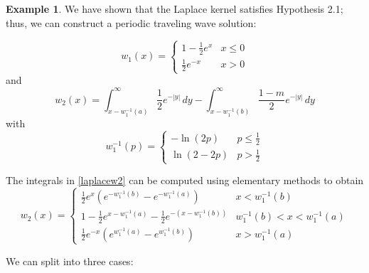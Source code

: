 \documentclass[11pt]{article}
\theoremstyle{definition}
\newtheorem{ex}[thm]{Example}
\numberwithin{equation}{section}
\numberwithin{thm}{section}
\newcommand{\winva}{{w_1^{-1}(a)}}
\newcommand{\winvb}{{w_1^{-1}(b)}}
\begin{document}
\begin{ex}
We have shown that the Laplace kernel satisfies Hypothesis 2.1; thus, we can construct a periodic traveling wave solution:

\begin{equation}
w_1(x) =   \begin{cases} 
1 - \frac{1}{2}e^{x} & x \leq 0 \\
\frac{1}{2}e^{-x} & x > 0
\end{cases}
\end{equation}
and
\begin{equation}\label{laplacew2}
w_2(x) = \int_{x-\winva}^{\infty} \frac{1}{2} e^{-|y|} \,dy - \int_{x-\winvb}^{\infty} \frac{1-m}{2} e^{-|y|} \,dy
\end{equation}
with
$$ w_1^{-1}(p) = \begin{cases} -\ln(2p) & p\leq \frac{1}{2} \\ \ln(2-2p) & p > \frac{1}{2} \end{cases} $$

The integrals in \eqref{laplacew2} can be computed using elementary methods to obtain
\begin{equation}
w_2(x) = \begin{cases}
\frac{1}{2} e^x \left( e^{-w_1^{-1}(b)} -e^{-w_1^{-1}(a)} \right)  & x < w_1^{-1}(b) \\
1 - \frac{1}{2} e^{x-w_1^{-1}(a)} - \frac{1}{2} e^{-(x-w_1^{-1}(b))} & w_1^{-1}(b) < x < w_1^{-1}(a) \\
\frac{1}{2} e^{-x} \left(  e^{w_1^{-1}(a)} - e^{w_1^{-1}(b)} \right) & x > w_1^{-1}(a)
\end{cases}
\end{equation}

We can split into three cases:



\end{ex}
\end{document}
